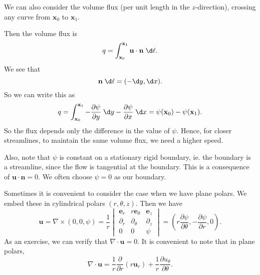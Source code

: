 \documentclass[a4paper]{article}
\begin{document}
We can also consider the volume flux (per unit length in the $z$-direction), crossing any curve from $\mathbf{x}_0$ to $\mathbf{x}_1$.
\begin{center}
\end{center}
Then the volume flux is
\[
  q = \int_{\mathbf{x}_0}^{\mathbf{x}_1} \mathbf{u}\cdot \mathbf{n}\;\d \ell.
\]
We see that
\[
  \mathbf{n}\;\d \ell = (-\d y, \d x).
\]
So we can write this as
\[
  q = \int_{\mathbf{x}_0}^{\mathbf{x}_1} -\frac{\partial \psi}{\partial y}\;\d y - \frac{\partial \psi}{\partial x}\;\d x = \psi(\mathbf{x}_0) - \psi(\mathbf{x}_1).
\]
So the flux depends only the difference in the value of $\psi$. Hence, for closer streamlines, to maintain the same volume flux, we need a higher speed.

Also, note that $\psi$ is constant on a stationary rigid boundary, ie. the boundary is a streamline, since the flow is tangential at the boundary. This is a consequence of $\mathbf{u}\cdot \mathbf{n} = 0$. We often choose $\psi = 0$ as our boundary.

Sometimes it is convenient to consider the case when we have plane polars. We embed these in cylindrical polars $(r, \theta, z)$. Then we have
\[
  \mathbf{u} = \nabla \times (0, 0, \psi) = \frac{1}{r}
  \begin{vmatrix}
    \mathbf{e}_r & r \mathbf{e}_\theta & \mathbf{e}_z\\
    \partial_r & \partial_\theta & \partial_z\\
    0 & 0 & \psi
  \end{vmatrix}
  =\left(r \frac{\partial \psi}{\partial \theta}, -\frac{\partial \psi}{\partial r}, 0\right).
\]
As an exercise, we can verify that $\nabla \cdot \mathbf{u} = 0$. It is convenient to note that in plane polars,
\[
  \nabla \cdot \mathbf{u} = \frac{1}{r} \frac{\partial}{\partial r} (r \mathbf{u}_r) + \frac{1}{r} \frac{\partial u_\theta}{\partial \theta}.
\]
\end{document}
